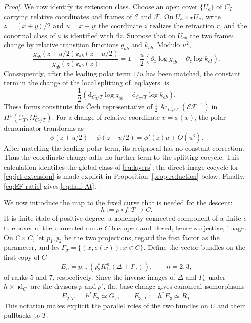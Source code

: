 \documentclass[11pt,a4paper,dvipsnames]{amsart}
\numberwithin{equation}{section}
\theoremstyle{plain}
\theoremstyle{definition}
\newcommand{\cE}{\mathcal E}
\newcommand{\cF}{\mathcal F}
\newcommand{\At}{\operatorname{At}}
\newcommand{\id}{\operatorname{id}}
\newcommand{\dd}{\mathrm d}
\begin{document}
\begin{proof}
We now identify its extension class.  Choose an open cover
$\{U_a\}$ of $C_T$ carrying relative coordinates and frames of $\cE$ and
$\cF$.  On $U_a\times_TU_a$, write
$z=(x+y)/2$ and $u=x-y$; the coordinate $z$ realizes the retraction
$r$, and the conormal class of $u$ is identified with $\dd z$.
Suppose that on $U_{ab}$ the two frames change
by relative transition functions $g_{ab}$ and $k_{ab}$.  Modulo $u^2$,
$$
 \frac{g_{ab}(z+u/2)k_{ab}(z-u/2)}
      {g_{ab}(z)k_{ab}(z)}
 =1+\frac{u}{2}
   \left(\partial_z\log g_{ab}
        -\partial_z\log k_{ab}\right).
$$
Consequently, after the leading polar term $1/u$ has been matched, the
constant term in the change of the local splitting of
\eqref{eq:layers} is
$$
 \frac12\left(
 \dd_{C_T/T}\log g_{ab}-\dd_{C_T/T}\log k_{ab}
 \right).
$$
These forms constitute the \v Cech representative of
$\frac12\At_{C_T/T}(\cE\cF^{-1})$ in
$H^1(C_T,\Omega^1_{C_T/T})$.  For a change of relative coordinate $v=\phi(x)$, the polar denominator
transforms as
$$
 \phi(z+u/2)-\phi(z-u/2)=\phi'(z)u+O(u^3).
$$
After matching the leading polar term, its reciprocal has no constant
correction.  Thus the coordinate change adds no further term to the
splitting cocycle.  This calculation identifies the global class of
\eqref{eq:layers}; the direct-image cocycle for \eqref{eq:jet-extension}
is made explicit in Proposition~\ref{prop:reduction} below.  Finally,
\eqref{eq:EF-ratio} gives \eqref{eq:half-At}.
\end{proof}

We now introduce the map to the fixed curve that is needed for the descent:
\begin{equation}\label{eq:h-map}
 h:=\rho\circ f:T\longrightarrow C.
\end{equation}
It is finite $\acute{e}$tale of positive degree: a nonempty connected
component of a finite $\acute{e}$tale cover of the connected curve
$\widetilde C$ has open and closed, hence surjective, image.  On $C\times C$, let $p_1,p_2$ be the two
projections, regard the first factor as the parameter, and let
$\Gamma_\sigma=\{(x,\sigma(x)):x\in C\}$.  Define the vector bundles on
the first copy of $C$
\begin{equation}\label{eq:En}
 E_n=p_{1*}\!\left(p_2^*K_C^n(\Delta+\Gamma_\sigma)\right),
 \qquad n=2,3,
\end{equation}
of ranks $5$ and $7$, respectively.  Since the inverse images of
$\Delta$ and $\Gamma_\sigma$ under $h\times\id_C$ are the divisors $p$
and $p'$, flat base change gives canonical isomorphisms
\begin{equation}\label{eq:GT-RT-pullback}
 E_{2,T}:=h^*E_2\simeq G_T,
 \qquad
 E_{3,T}:=h^*E_3\simeq R_T.
\end{equation}
This notation makes explicit the parallel roles of the two bundles on
$C$ and their pullbacks to $T$.
\end{document}
